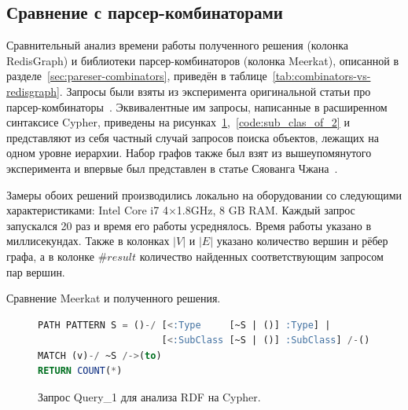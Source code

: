 \subsection{Сравнение с парсер-комбинаторами}\label{sec:parse-comp-compare}
Сравнительный анализ времени работы полученного решения (колонка RedisGraph) и библиотеки парсер-комбинаторов (колонка Meer\-kat), описанной в разделе~\ref{sec:pareser-combinators}, приведён в таблице~\ref{tab:combinators-vs-redisgraph}. Запросы были взяты из эксперимента оригинальной статьи про парсер-комбинаторы~\cite{parser-combinators}. Эквивалентные им запросы, написанные в расширенном синтаксисе Cyp\-her, приведены на рисунках~\ref{code:sub_clas_of_1},~\ref{code:sub_clas_of_2} и представляют из себя частный случай запросов поиска объектов, лежащих на одном уровне иерархии. Набор графов также был взят из вышеупомянутого эксперимента и впервые был представлен в статье Сяованга Чжана~\cite{zhlang-2016}.


Замеры обоих решений производились локально на оборудовании со следующими характеристиками: Intel Core i7 4$\times$1.8GHz, 8 GB RAM. Каждый запрос запускался 20 раз и время его работы усреднялось. Время работы указано в миллисекундах. Также в колонках $|V|$ и $|E|$ указано количество вершин и рёбер графа, а в колонке $\#result$ количество найденных соответствующим запросом пар вершин. 

\begin{table}[h!]
\begin{adjustbox}{max width=\textwidth}

\end{adjustbox}
\caption{Сравнение Meerkat и полученного решения.}
\label{tab:combinators-vs-redisgraph}
\end{table}

\begin{figure}[h!]
\begin{adjustbox}{max width=\textwidth}
\begin{lstlisting}[language=sql]
PATH PATTERN S = ()-/ [<:Type     [~S | ()] :Type] | 
                      [<:SubClass [~S | ()] :SubClass] /-()
MATCH (v)-/ ~S /->(to)
RETURN COUNT(*)
\end{lstlisting}
\end{adjustbox}
\caption{Запрос Query\_1 для анализа RDF на Cypher.}
\label{code:sub_clas_of_1}
\end{figure}

